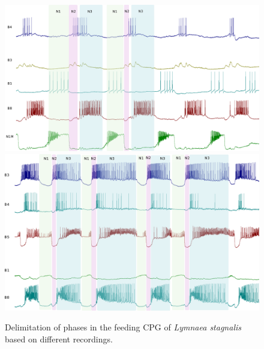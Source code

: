 \begin{figure}[bth!]
\centering
\includegraphics[width=\textwidth]{img/invariants/example_phases_1.pdf}
\\
\vspace{10pt}
\includegraphics[width=\textwidth]{img/invariants/example_phases_2.pdf}
\caption{Delimitation of phases in the feeding CPG of \textit{Lymnaea stagnalis} based on different recordings.}
\label{fig:example lymnaea phases recording}
\end{figure}





